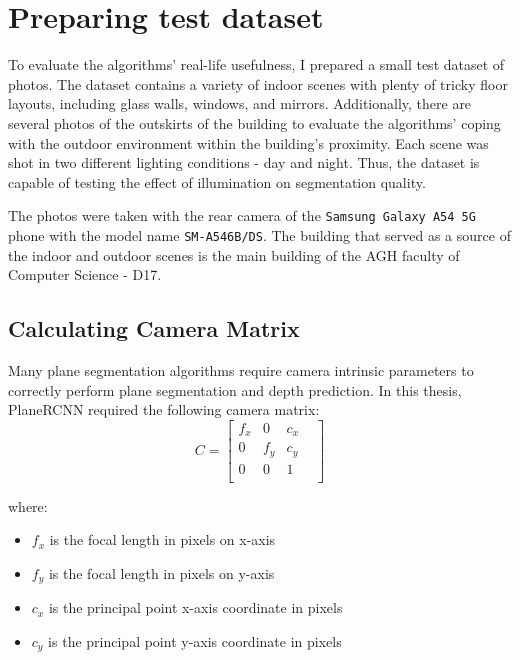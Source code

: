 \section{Preparing test dataset}

To evaluate the algorithms' real-life usefulness, I prepared a small test dataset of photos.
The dataset contains a variety of indoor scenes with plenty of tricky floor layouts,
including glass walls, windows, and mirrors.
Additionally, there are several photos of the outskirts of the building
to evaluate the algorithms' coping with the outdoor environment within the building's proximity.
Each scene was shot in two different lighting conditions - day and night.
Thus, the dataset is capable of testing the effect of illumination on segmentation quality.

\par

The photos were taken with the rear camera of the \texttt{Samsung Galaxy A54 5G} phone
with the model name \texttt{SM-A546B/DS}.
The building that served as a source of the indoor and outdoor scenes
is the main building of the AGH faculty of Computer Science - D17.

\subsection{Calculating Camera Matrix}

Many plane segmentation algorithms require camera intrinsic parameters
to correctly perform plane segmentation and depth prediction.
In this thesis, PlaneRCNN required the following camera matrix:
\begin{equation} \label{eq:camera-matrix}
	C = \begin{bmatrix}
		f_x &   0 & c_x & \\
		  0 & f_y & c_y & \\
		  0 &   0 &   1 & \\
	\end{bmatrix}
\end{equation}

where:
\begin{itemize}
\item $f_x$ is the focal length in pixels on x-axis
\item $f_y$ is the focal length in pixels on y-axis
\item $c_x$ is the principal point x-axis coordinate in pixels
\item $c_y$ is the principal point y-axis coordinate in pixels
\end{itemize}

